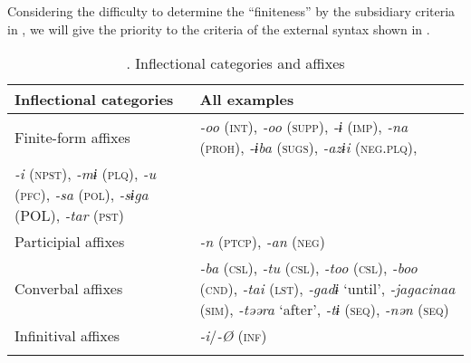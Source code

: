 Considering the difficulty to determine the “finiteness” by the subsidiary criteria in , we will give the priority to the criteria of the external syntax shown in .

\begin{table}
\caption{\label{tab:key:79}. Inflectional categories and affixes}
\begin{tabular}{ll}
  \lsptoprule
Inflectional categories  & All examples                                                                                                                                                                                                                                                                              \\
\midrule
Finite-form affixes &  \textit{-oo} (\textsc{int}), \textit{-oo} (\textsc{supp}), \textit{-ɨ} (\textsc{imp}), \textit{-na} (\textsc{proh}), \textit{-ɨba} (\textsc{sugs}), \textit{-azɨi} (\textsc{neg}.\textsc{plq}),                                                                                                 \\
\textit{-i} (\textsc{npst}), \textit{-mɨ} (\textsc{plq}), \textit{-u} (\textsc{pfc}), \textit{-sa} (\textsc{pol}), \textit{-sɨga} (POL), \textit{-tar} (\textsc{pst})                                                                                                                                                \\
Participial affixes&   \textit{-n} (\textsc{ptcp}), \textit{-an} (\textsc{neg})                                                                                                                                                                                                                                        \\
Converbal affixes&   \textit{-ba} (\textsc{csl}), \textit{-tu} (\textsc{csl}), \textit{-too} (\textsc{csl}), \textit{-boo} (\textsc{cnd}), \textit{-tai} (\textsc{lst}), \textit{-gadɨ} ‘until’, \textit{-jagacinaa} (\textsc{sim}), \textit{-təəra} ‘after’, \textit{-tɨ} (\textsc{seq}), \textit{-nən} (\textsc{seq})\\
Infinitival affixes&   \textit{-i}/\textit{-Ø} (\textsc{inf})                                                                                                                                                                                                                                                          \\
\lspbottomrule
\end{tabular}
\end{table}

